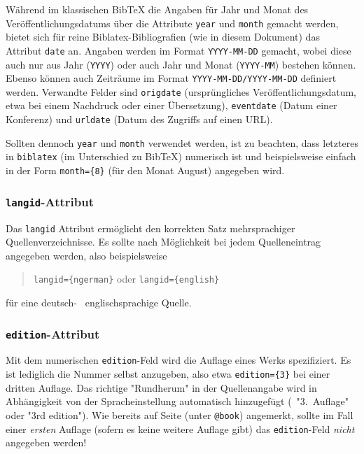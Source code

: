 Während im klassischen BibTeX die Angaben für Jahr und Monat des
Veröffentlichungsdatums über die Attribute \texttt{year} und \texttt{month}
gemacht werden, bietet sich für reine Biblatex-Bibliografien (wie in diesem
Dokument) das Attribut \texttt{date} an. Angaben werden im Format
\texttt{YYYY-MM-DD} gemacht, wobei diese auch nur aus Jahr (\texttt{YYYY})
oder auch Jahr und Monat (\texttt{YYYY-MM}) bestehen können. Ebenso können
auch Zeiträume im Format \texttt{YYYY-MM-DD/YYYY-MM-DD} definiert werden.
Verwandte Felder sind \texttt{origdate} (ursprüngliches
Veröffentlichungsdatum, etwa bei einem Nachdruck oder einer Übersetzung),
\texttt{eventdate} (Datum einer Konferenz) und \texttt{urldate} (Datum des
Zugriffs auf einen URL).

Sollten dennoch \texttt{year} und \texttt{month} verwendet werden, ist zu
beachten, dass letzteres in \texttt{biblatex} (im Unterschied zu BibTeX)
numerisch ist und beispielsweise einfach in der Form \verb!month={8}! (für
den Monat August) angegeben wird.

\subsubsection{\texttt{langid}-Attribut}

Das \texttt{langid} Attribut ermöglicht den korrekten Satz mehrsprachiger
Quellenverzeichnisse. Es sollte nach Möglichkeit bei jedem Quelleneintrag
angegeben werden, also beispielsweise
%
\begin{quote}
\verb!langid={ngerman}! \quad oder \quad \verb!langid={english}!
\end{quote}
%
für eine deutsch- \bzw\ englischsprachige Quelle.

\subsubsection{\texttt{edition}-Attribut}

Mit dem numerischen \texttt{edition}-Feld wird die Auflage eines Werks
spezifiziert. Es ist lediglich die Nummer selbst anzugeben, also etwa
\verb!edition={3}! bei einer dritten Auflage. Das richtige "Rundherum" in der
Quellenangabe wird in Abhängigkeit von der Spracheinstellung automatisch
hinzugefügt (\zB\ "3.\ Auflage" oder "3rd edition"). Wie bereits auf Seite
\pageref{sec:@book} (unter \texttt{@book}) angemerkt, sollte im Fall einer
\emph{ersten} Auflage (sofern es keine weitere Auflage gibt) das
\texttt{edition}-Feld \emph{nicht} angegeben werden!


